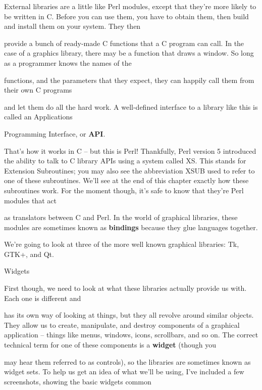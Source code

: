 \documentclass[a4paper,11pt]{book}
\begin{document}
\noindent 

\noindent External libraries are a little like Perl modules, except that they're more likely to be written in C. Before you can use them, you have to obtain them, then build and install them on your system. They then

\noindent provide a bunch of ready-made C functions that a C program can call. In the case of a graphics library, there may be a function that draws a window. So long as a programmer knows the names of the

\noindent functions, and the parameters that they expect, they can happily call them from their own C programs

\noindent and let them do all the hard work. A well-defined interface to a library like this is called an Applications

\noindent Programming Interface, or \textbf{API}.

\noindent 

\noindent That's how it works in C -- but this is Perl! Thankfully, Perl version 5 introduced the ability to talk to C library APIs using a system called XS. This stands for Extension Subroutines; you may also see the abbreviation XSUB used to refer to one of these subroutines. We'll see at the end of this chapter exactly how these subroutines work. For the moment though, it's safe to know that they're Perl modules that act

\noindent as translators between C and Perl. In the world of graphical libraries, these modules are sometimes known as \textbf{bindings }because they glue languages together.

\noindent 

\noindent We're going to look at three of the more well known graphical libraries: Tk, GTK+, and Qt.

\noindent 

\noindent Widgets

\noindent 

\noindent First though, we need to look at what these libraries actually provide us with. Each one is different and

\noindent has its own way of looking at things, but they all revolve around similar objects. They allow us to create, manipulate, and destroy components of a graphical application -- things like menus, windows, icons, scrollbars, and so on. The correct technical term for one of these components is a \textbf{widget }(though you

\noindent may hear them referred to as controls), so the libraries are sometimes known as widget sets. To help us get an idea of what we'll be using, I've included a few screenshots, showing the basic widgets common
\end{document}
